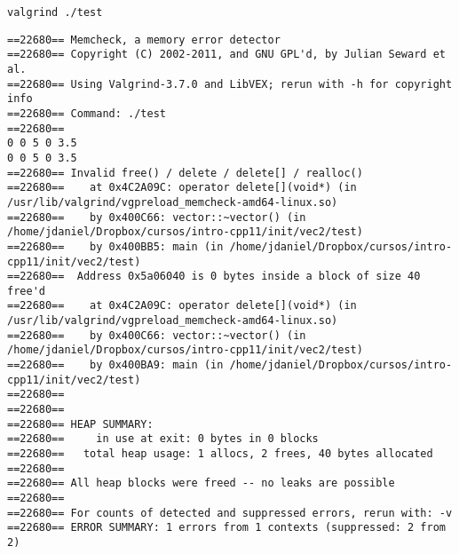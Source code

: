 \begin{frame}[fragile]
\begin{lstlisting}[style=terminal]
valgrind ./test
\end{lstlisting}
\begin{lstlisting}[style=terminal,basicstyle=\tiny\ttfamily]
==22680== Memcheck, a memory error detector
==22680== Copyright (C) 2002-2011, and GNU GPL'd, by Julian Seward et al.
==22680== Using Valgrind-3.7.0 and LibVEX; rerun with -h for copyright info
==22680== Command: ./test
==22680== 
0 0 5 0 3.5 
0 0 5 0 3.5 
==22680== Invalid free() / delete / delete[] / realloc()
==22680==    at 0x4C2A09C: operator delete[](void*) (in /usr/lib/valgrind/vgpreload_memcheck-amd64-linux.so)
==22680==    by 0x400C66: vector::~vector() (in /home/jdaniel/Dropbox/cursos/intro-cpp11/init/vec2/test)
==22680==    by 0x400BB5: main (in /home/jdaniel/Dropbox/cursos/intro-cpp11/init/vec2/test)
==22680==  Address 0x5a06040 is 0 bytes inside a block of size 40 free'd
==22680==    at 0x4C2A09C: operator delete[](void*) (in /usr/lib/valgrind/vgpreload_memcheck-amd64-linux.so)
==22680==    by 0x400C66: vector::~vector() (in /home/jdaniel/Dropbox/cursos/intro-cpp11/init/vec2/test)
==22680==    by 0x400BA9: main (in /home/jdaniel/Dropbox/cursos/intro-cpp11/init/vec2/test)
==22680== 
==22680== 
==22680== HEAP SUMMARY:
==22680==     in use at exit: 0 bytes in 0 blocks
==22680==   total heap usage: 1 allocs, 2 frees, 40 bytes allocated
==22680== 
==22680== All heap blocks were freed -- no leaks are possible
==22680== 
==22680== For counts of detected and suppressed errors, rerun with: -v
==22680== ERROR SUMMARY: 1 errors from 1 contexts (suppressed: 2 from 2)
\end{lstlisting}
\end{frame}

